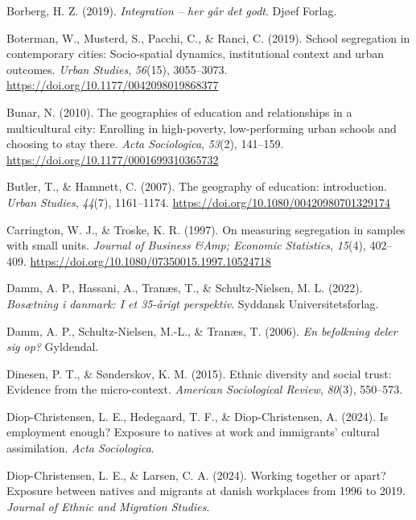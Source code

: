 \documentclass[
]{book}
\newlength{\cslhangindent}
\newenvironment{CSLReferences}[2] %
 {\begin{list}{}{%
  \setlength{\itemindent}{0pt}
  \setlength{\leftmargin}{0pt}
  \setlength{\parsep}{0pt}
  \ifodd #1
   \setlength{\leftmargin}{\cslhangindent}
   \setlength{\itemindent}{-1\cslhangindent}
  \fi
  \setlength{\itemsep}{#2\baselineskip}}}
 {\end{list}}
\begin{document}
\begin{CSLReferences}{1}{0}
Borberg, H. Z. (2019). \emph{Integration -- her går det godt}. Djøef Forlag.

Boterman, W., Musterd, S., Pacchi, C., \& Ranci, C. (2019). School segregation in contemporary cities: Socio-spatial dynamics, institutional context and urban outcomes. \emph{Urban Studies}, \emph{56}(15), 3055--3073. \url{https://doi.org/10.1177/0042098019868377}

Bunar, N. (2010). The geographies of education and relationships in a multicultural city: Enrolling in high-poverty, low-performing urban schools and choosing to stay there. \emph{Acta Sociologica}, \emph{53}(2), 141--159. \url{https://doi.org/10.1177/0001699310365732}

Butler, T., \& Hamnett, C. (2007). The geography of education: introduction. \emph{Urban Studies}, \emph{44}(7), 1161--1174. \url{https://doi.org/10.1080/00420980701329174}

Carrington, W. J., \& Troske, K. R. (1997). On measuring segregation in samples with small units. \emph{Journal of Business \&Amp; Economic Statistics}, \emph{15}(4), 402--409. \url{https://doi.org/10.1080/07350015.1997.10524718}

Damm, A. P., Hassani, A., Tranæs, T., \& Schultz-Nielsen, M. L. (2022). \emph{Bosætning i danmark: I et 35-årigt perspektiv}. Syddansk Universitetsforlag.

Damm, A. P., Schultz-Nielsen, M.-L., \& Tranæs, T. (2006). \emph{En befolkning deler sig op?} Gyldendal.

Dinesen, P. T., \& Sønderskov, K. M. (2015). Ethnic diversity and social trust: Evidence from the micro-context. \emph{American Sociological Review}, \emph{80}(3), 550--573.

Diop-Christensen, L. E., Hedegaard, T. F., \& Diop-Christensen, A. (2024). Is employment enough? Exposure to natives at work and immigrants' cultural assimilation. \emph{Acta Sociologica}.

Diop-Christensen, L. E., \& Larsen, C. A. (2024). Working together or apart? Exposure between natives and migrants at danish workplaces from 1996 to 2019. \emph{Journal of Ethnic and Migration Studies}.


\end{CSLReferences}
\end{document}
